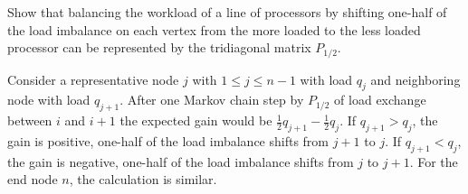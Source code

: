 \documentclass[12pt]{article}
\begin{document}
\renewcommand{\theexerciseseries}{}
\renewcommand{\theexercise}{\arabic{exercise}}

\begin{exercise}
    Show that balancing the workload of a line of processors by shifting
    one-half of the load imbalance on each vertex from the more loaded
    to the less loaded processor can be represented by the tridiagonal
    matrix \( P_{1/2} \).
\end{exercise}
\begin{solution}
    Consider a representative node \( j \) with \( 1 \le j \le n-1 \)
    with load \( q_j \) and neighboring node with load \( q_{j+1} \).
    After one Markov chain step by \( P_{1/2} \) of load exchange
    between \( i \) and \( i+1 \) the expected gain would be \( \frac{1}
    {2} q_{j+1} - \frac{1}{2} q_{j} \).  If \( q_{j+1} > q_j \), the
    gain is positive, one-half of the load imbalance shifts from \( j+1 \)
    to \( j \).  If \( q_{j+1} < q_j \), the gain is negative, one-half
    of the load imbalance shifts from \( j \) to \( j+1 \).  For the end
    node \( n \), the calculation is similar.
\end{solution}
\end{document}
